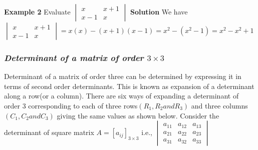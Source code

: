 \documentclass{article}
\begin{document}
\textbf{Example 2}
Evaluate 
\begin{math}
\begin{vmatrix}
x & x+1\\
x-1 & x
\end{vmatrix}
\end{math}
\newline
\newline
\textbf{Solution} We have
\newline
\newline
\begin{math}
\begin{vmatrix}
x & x+1\\
x-1 & x
\end{vmatrix}
=x(x)-(x+1)(x-1)=x^2-(x^2-1)=x^2-x^2+1
\end{math}

\subsubsection{\textit{Determinant of a matrix of order $3\times3$}}
Determinant of a matrix of order three can be determined by expressing it in terms of second order determinants. This is known as expansion of a determinant along a row(or a column). There are six ways of expanding a determinant of order $3$ corresponding to each of three rows$(R_1, R_2 and R_3)$ and three columns$(C_1, C_2 and C_3)$ giving the same values as shown below.
\newline
\hspace{2cm}Consider the determinant of square matrix $A=[a_{ij}]_{3\times3}$
\newline
\newline
i.e.,\hspace{8cm}
\begin{math}
\begin{vmatrix}
a_{11} & a_{12} & a_{13}\\
a_{21} & a_{22} & a_{23}\\
a_{31} & a_{32} & a_{33}
\end{vmatrix}
\end{math}
\end{document}
